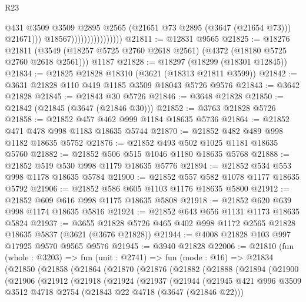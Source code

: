 \begin{lexlean}{R23}
\begin{coremodule}
                                          @431
                                          @3509
                                          @3509
                                          @2895
                                          @2565
                                          (@21651 @73 @2895 (@3647 (@21654 @73)))
                                          @21671)))
                                    @18567))))))))))))))))
@21811 := @12831 @9565
@21825 := @18276
    @21811
    (@3549 (@18257 @5725 @2760 @2618 @2561) (@4372 (@18180 @5725 @2760 @2618 @2561)))
    @1187
@21828 := @18297 (@18299 (@18301 @12845))
@21834 := @21825 @21828 @18310 (@3621 (@18313 @21811 @3599))
@21842 := @3631 @21828 @110 @419 @1185 @3509 @18043 @5726 @9576
@21843 := @3642 @21828
@21845 := @21843 @30 @5726
@21846 := @3648 @21828
@21850 := @21842 (@21845 (@3647 (@21846 @30)))
@21852 := @3763 @21828 @5726
@21858 := @21852 @457 @462 @999 @1184 @18635 @5736
@21864 := @21852 @471 @478 @998 @1183 @18635 @5744
@21870 := @21852 @482 @489 @998 @1182 @18635 @5752
@21876 := @21852 @493 @502 @1025 @1181 @18635 @5760
@21882 := @21852 @506 @515 @1046 @1180 @18635 @5768
@21888 := @21852 @519 @530 @998 @1179 @18635 @5776
@21894 := @21852 @534 @553 @998 @1178 @18635 @5784
@21900 := @21852 @557 @582 @1078 @1177 @18635 @5792
@21906 := @21852 @586 @605 @1103 @1176 @18635 @5800
@21912 := @21852 @609 @616 @998 @1175 @18635 @5808
@21918 := @21852 @620 @639 @998 @1174 @18635 @5816
@21924 := @21852 @643 @656 @1131 @1173 @18635 @5824
@21937 := @3655 @21828 @5726 @465 @402 @998 @1172 @2565 @21828 @18635 @5837 (@3621 (@3676 @21828))
@21944 := @4008 @21828 @103 @997 @17925 @9570 @9565 @9576
@21945 := @3940 @21828
@22006 := @21810
    (fun (whole : @3203) =>
    fun (unit : @2741) =>
    fun (mode : @16) =>
    @21834
      (@21850
        (@21858
          (@21864
            (@21870
              (@21876
                (@21882
                  (@21888
                    (@21894
                      (@21900
                        (@21906
                          (@21912
                            (@21918
                              (@21924
                                (@21937
                                  (@21944
                                    (@21945
                                      @421
                                      @996
                                      @3509
                                      @3512
                                      @4718
                                      @2754
                                      (@21843 @22 @4718 (@3647 (@21846 @22)))

\end{coremodule}
\end{lexlean}
